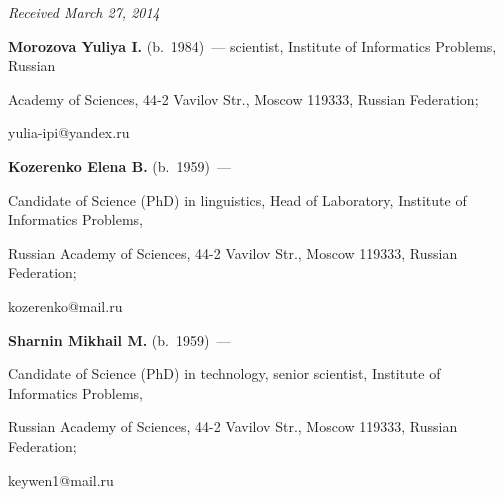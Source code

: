 \vspace*{-6pt}





\hfill{\small\textit{Received March 27, 2014}}





\vspace*{-6pt}








  \Contr





\noindent


\textbf{Morozova Yuliya I.} (b.\ 1984)~--- scientist, Institute of Informatics Problems, Russian


Academy of Sciences, 44-2 Vavilov Str., Moscow 119333, Russian Federation;


yulia-ipi@yandex.ru





\vspace*{3pt}





\noindent


\textbf{Kozerenko Elena B.} (b.\ 1959)~---


Candidate of Science (PhD) in linguistics, Head of Laboratory, Institute of Informatics Problems,


Russian Academy of Sciences, 44-2 Vavilov Str., Moscow 119333, Russian Federation;


kozerenko@mail.ru


\vspace*{3pt}





\noindent


\textbf{Sharnin Mikhail M.} (b.\ 1959)~---


Candidate of Science (PhD) in technology, senior scientist, Institute of Informatics Problems,


Russian Academy of Sciences, 44-2 Vavilov Str., Moscow 119333, Russian Federation;


  keywen1@mail.ru








\label{end\stat}





\renewcommand{\bibname}{\protect\rmfamily Литература}





